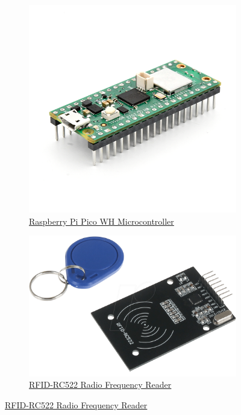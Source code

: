 \documentclass{article}
\begin{document}
\begin{figure}[H]
	\centering
	\begin{subfigure}[b]{0.45\textwidth}
		\includegraphics[width=\textwidth]{../images/picowh.png}
		\caption*{\href{https://www.raspberrypi.com/products/raspberry-pi-pico/}{Raspberry Pi Pico WH Microcontroller}}
		\label{fig:picowh}
	\end{subfigure}
	\hfill
	\begin{subfigure}[b]{0.45\textwidth}
		\includegraphics[width=\textwidth]{../images/mfrc522.png}
		\caption*{\href{https://www.keyestudio.com/products/keyestudio-mfrc522-rfid-s50-fudan-card-ic-card-module-with-spi-port-for-arduino-uno-r3-mega-2560-r3}{RFID-RC522 Radio Frequency Reader}}
		\label{fig:MFRC522}
	\end{subfigure}
\end{figure}
\end{document}
